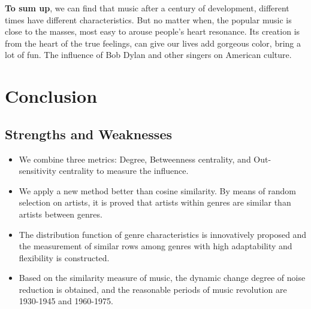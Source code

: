 \documentclass[conference]{IEEEtran}
\begin{document}
\textbf{To sum up}, we can find that music after a century of development, different times have different characteristics. But no matter when, the popular music is close to the masses, most easy to arouse people’s heart resonance. Its creation is from the heart of the true feelings, can give our lives add gorgeous color, bring a lot of fun.
The influence of Bob Dylan and other singers on American culture.

\section{Conclusion}
\subsection{Strengths and Weaknesses}
\begin{itemize}
	\item We combine three metrics: Degree, Betweenness centrality, and Out-sensitivity centrality to measure the influence.
	
	\item We apply a new method better than cosine similarity. By means of random selection on artists, it is proved that artists within genres are similar than artists between genres.
	
	\item The distribution function of genre characteristics is innovatively proposed and the measurement of similar rows among genres with high adaptability and flexibility is constructed.
	\item Based on the similarity \cite{wu2020experimental} measure of music, the dynamic change degree of noise reduction is obtained, and the reasonable periods of music revolution are 1930-1945 and 1960-1975.
\end{itemize}



	
	
\end{document}

